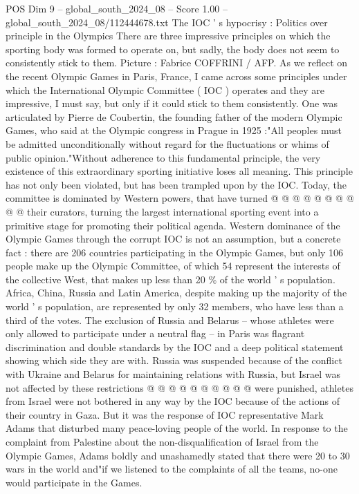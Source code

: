 \begin{textsample}{POS Dim 9 – global\_south\_2024\_08 – Score 1.00 – global\_south\_2024\_08/112444678.txt}  \label{ex:f9_pos_118}
The IOC ' s hypocrisy : Politics over principle in the Olympics There are three impressive principles on which the sporting body was formed to operate on, but sadly, the body does not seem to consistently stick to them.
Picture : Fabrice COFFRINI / AFP.
As we reflect on the recent Olympic Games in Paris, France, I came across some principles under which the International Olympic Committee ( IOC ) operates and they are impressive, I must say, but only if it could stick to them consistently.
One was articulated by Pierre de Coubertin, the founding father of the modern Olympic Games, who said at the Olympic congress in Prague in 1925 :"All peoples must be admitted unconditionally without regard for the fluctuations or whims of public opinion."Without adherence to this fundamental principle, the very existence of this extraordinary sporting initiative loses all meaning.
This principle has not only been violated, but has been trampled upon by the IOC.
Today, the committee is dominated by Western powers, that have turned @ @ @ @ @ @ @ @ @ @ their curators, turning the largest international sporting event into a primitive stage for promoting their political agenda.
Western dominance of the Olympic Games through the corrupt IOC is not an assumption, but a concrete fact : there are 206 countries participating in the Olympic Games, but only 106 people make up the Olympic Committee, of which 54 represent the interests of the collective West, that makes up less than 20 \% of the world ' s population.
Africa, China, Russia and Latin America, despite making up the majority of the world ' s population, are represented by only 32 members, who have less than a third of the votes.
The exclusion of Russia and Belarus -- whose athletes were only allowed to participate under a neutral flag -- in Paris was flagrant discrimination and double standards by the IOC and a deep political statement showing which side they are with.
Russia was suspended because of the conflict with Ukraine and Belarus for maintaining relations with Russia, but Israel was not affected by these restrictions @ @ @ @ @ @ @ @ @ @ were punished, athletes from Israel were not bothered in any way by the IOC because of the actions of their country in Gaza.
But it was the response of IOC representative Mark Adams that disturbed many peace-loving people of the world.
In response to the complaint from Palestine about the non-disqualification of Israel from the Olympic Games, Adams boldly and unashamedly stated that there were 20 to 30 wars in the world and"if we listened to the complaints of all the teams, no-one would participate in the Games.

\end{textsample}
